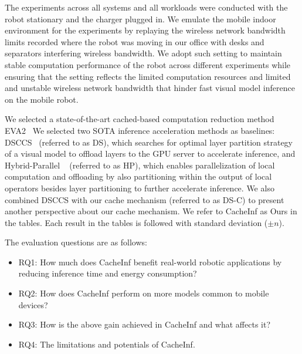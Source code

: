 The experiments across all systems and all workloads were conducted with the robot stationary and the charger plugged in.
We emulate the mobile indoor environment for the experiments by replaying the wireless network bandwidth limits recorded where the robot was moving in our office with desks and separators interfering wireless bandwidth.
We adopt such setting to maintain stable computation performance of the robot across different experiments while ensuring that the setting reflects the limited computation resources and limited and unstable wireless network bandwidth that hinder fast visual model inference on the mobile robot.

We selected a state-of-the-art cached-based computation reduction method EVA2~\cite{buckler_eva_2018}
We selected two SOTA inference acceleration methods as baselines: DSCCS~\cite{liang2023dnn} (referred to as DS), which searches for optimal layer partition strategy of a visual model to offload layers to the GPU server to accelerate inference, and Hybrid-Parallel ~\cite{sun2024hybridparallel} (referred to as HP), which enables parallelization of local computation and offloading by also partitioning within the output of local operators besides layer partitioning to further accelerate inference. 
We also combined DSCCS with our cache mechanism (referred to as DS-C) to present another perspective about our cache mechanism.
We refer to CacheInf as Ours in the tables.
Each result in the tables is followed with standard deviation ($\pm n$).

The evaluation questions are as follows:
\begin{itemize}
    \item RQ1: How much does CacheInf benefit real-world robotic applications by reducing inference time and energy consumption?
    \item RQ2: How does CacheInf perform on more models common to mobile devices?
    \item RQ3: How is the above gain achieved in CacheInf and what affects it?
    \item RQ4: The limitations and potentials of CacheInf.
\end{itemize}

